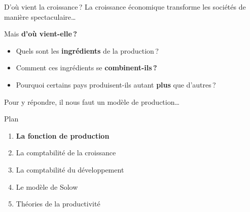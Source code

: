 \documentclass[aspectratio=169]{beamer}
\begin{document}
\begin{frame}{D'où vient la croissance\,?}
   La croissance économique transforme les sociétés de manière spectaculaire\ldots
   \vspace{0.3cm}

   Mais \textbf{d'où vient-elle\,?}
   \vspace{0.3cm}
   \begin{itemize}
      \setlength\itemsep{0.2cm}
      \item Quels sont les \textbf{ingrédients} de la production\,?
      \item Comment ces ingrédients se \textbf{combinent-ils\,?}
      \item Pourquoi certains pays produisent-ils autant \textbf{plus} que d'autres\,?
   \end{itemize}
   \vspace{0.3cm}
   Pour y répondre, il nous faut un modèle de production\ldots
\end{frame}

\begin{frame}{Plan}
   \begin{enumerate}
      \setlength\itemsep{0.3cm}
      \item \textbf{La fonction de production}
      \item La comptabilité de la croissance
      \item La comptabilité du développement
      \item Le modèle de Solow
      \item Théories de la productivité
   \end{enumerate}
\end{frame}

\end{document}
